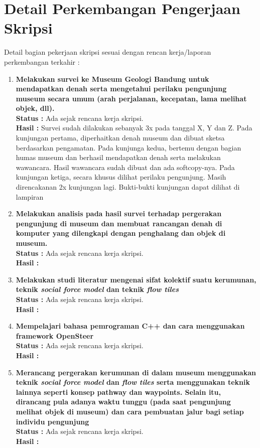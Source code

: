 \documentclass[a4paper,twoside]{article}
\begin{document}
\section{Detail Perkembangan Pengerjaan Skripsi}
Detail bagian pekerjaan skripsi sesuai dengan rencan kerja/laporan perkembangan terkahir :
\begin{enumerate}
	\item \textbf{Melakukan survei ke Museum Geologi Bandung untuk mendapatkan denah serta mengetahui perilaku pengunjung museum secara umum (arah perjalanan, kecepatan, lama melihat objek, dll).}\\
	{\bf Status :} Ada sejak rencana kerja skripsi.\\
	{\bf Hasil :} Survei sudah dilakukan sebanyak 3x pada tanggal X, Y dan Z. Pada kunjungan pertama, diperhaitkan denah museum dan dibuat sketsa berdasarkan pengamatan. Pada kunjunga kedua, bertemu dengan bagian humas museum dan berhasil mendapatkan denah serta melakukan wawancara. Hasil wawancara sudah dibuat dan ada softcopy-nya. Pada kunjungan ketiga, secara khusus dilihat perilaku pengunjung. Masih direncakanan 2x kunjungan lagi. Bukti-bukti kunjungan dapat dilihat di lampiran
	
	\item \textbf{Melakukan analisis pada hasil survei terhadap pergerakan pengunjung di museum dan membuat rancangan denah di komputer yang dilengkapi dengan penghalang dan objek di museum.}\\
	{\bf Status :} Ada sejak rencana kerja skripsi.\\
	{\bf Hasil :}
	
	\item \textbf{Melakukan studi literatur mengenai sifat kolektif suatu kerumunan, teknik {\it social force model} dan teknik {\it flow tiles}}\\
	{\bf Status :} Ada sejak rencana kerja skripsi.\\
	{\bf Hasil :}
	
	\item \textbf{Mempelajari bahasa pemrograman C++ dan cara menggunakan framework OpenSteer}\\
	{\bf Status :} Ada sejak rencana kerja skripsi.\\
	{\bf Hasil :}
	
	\item \textbf{Merancang pergerakan kerumunan di dalam museum menggunakan teknik {\it social force model} dan {\it flow tiles} serta menggunakan teknik lainnya seperti konsep pathway dan waypoints. Selain itu, dirancang pula adanya waktu tunggu (pada saat pengunjung melihat objek di museum) dan cara pembuatan jalur bagi setiap individu pengunjung}\\
	{\bf Status :} Ada sejak rencana kerja skripsi.\\
	{\bf Hasil :}
	

\end{enumerate}
\end{document}
